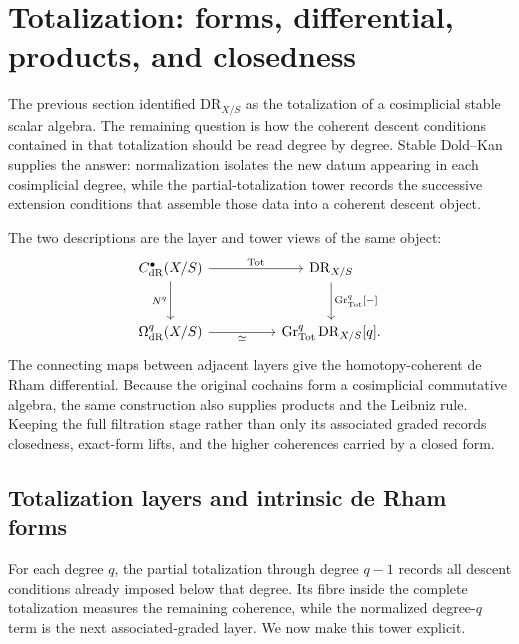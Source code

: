 \section{Totalization: forms, differential, products, and closedness}
\label{sec:de-Rham-coherence-forms}
\label{sec:de-Rham-functoriality}

The previous section identified \(\mathrm{DR}_{X/S}\) as the totalization of a
cosimplicial stable scalar algebra. The remaining question is how the
coherent descent conditions contained in that totalization should be read
degree by degree. Stable Dold--Kan supplies the answer: normalization isolates
the new datum appearing in each cosimplicial degree, while the
partial-totalization tower records the successive extension conditions that
assemble those data into a coherent descent object.

The two descriptions are the layer and tower views of the same object:
\[
\begin{tikzcd}[column sep=huge,row sep=large]
  C^\bullet_{\mathrm{dR}}(X/S)
      \arrow[r,"{\operatorname*{Tot}}"]
      \arrow[d,"{N^q}"']
  &
  \mathrm{DR}_{X/S}
      \arrow[d,"{\operatorname{Gr}^q_{\mathrm{Tot}}[-]}"]
  \\
  \Omega^q_{\mathrm{dR}}(X/S)
      \arrow[r,"{\simeq}"']
  &
  \operatorname{Gr}^q_{\mathrm{Tot}}\mathrm{DR}_{X/S}[q].
\end{tikzcd}
\]
The connecting maps between adjacent layers give the homotopy-coherent de
Rham differential. Because the original cochains form a cosimplicial
commutative algebra, the same construction also supplies products and the
Leibniz rule. Keeping the full filtration stage rather than only its
associated graded records closedness, exact-form lifts, and the higher
coherences carried by a closed form.
\subsection{Totalization layers and intrinsic de Rham forms}
\label{sec:complete-totalization}


For each degree \(q\), the partial totalization through degree \(q-1\)
records all descent conditions already imposed below that degree. Its fibre
inside the complete totalization measures the remaining coherence, while the
normalized degree-\(q\) term is the next associated-graded layer. We now
make this tower explicit.


